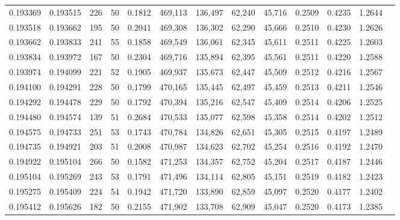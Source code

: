 \begin{tabular}{rrrrrrrrrrrrr}
0.193369 & 0.193515 &   226 &  50 &                                     0.1812 & 469,113 & 136,497 &  62,240 &  45,716 & 0.2509 & 0.4235 & 1.2644 \\
0.193518 & 0.193662 &   195 &  50 &                                     0.2041 & 469,308 & 136,302 &  62,290 &  45,666 & 0.2510 & 0.4230 & 1.2626 \\
0.193662 & 0.193833 &   241 &  55 &                                     0.1858 & 469,549 & 136,061 &  62,345 &  45,611 & 0.2511 & 0.4225 & 1.2603 \\
0.193834 & 0.193972 &   167 &  50 &                                     0.2304 & 469,716 & 135,894 &  62,395 &  45,561 & 0.2511 & 0.4220 & 1.2588 \\
0.193974 & 0.194099 &   221 &  52 &                                     0.1905 & 469,937 & 135,673 &  62,447 &  45,509 & 0.2512 & 0.4216 & 1.2567 \\
0.194100 & 0.194291 &   228 &  50 &                                     0.1799 & 470,165 & 135,445 &  62,497 &  45,459 & 0.2513 & 0.4211 & 1.2546 \\
0.194292 & 0.194478 &   229 &  50 &                                     0.1792 & 470,394 & 135,216 &  62,547 &  45,409 & 0.2514 & 0.4206 & 1.2525 \\
0.194480 & 0.194574 &   139 &  51 &                                     0.2684 & 470,533 & 135,077 &  62,598 &  45,358 & 0.2514 & 0.4202 & 1.2512 \\
0.194575 & 0.194733 &   251 &  53 &                                     0.1743 & 470,784 & 134,826 &  62,651 &  45,305 & 0.2515 & 0.4197 & 1.2489 \\
0.194735 & 0.194921 &   203 &  51 &                                     0.2008 & 470,987 & 134,623 &  62,702 &  45,254 & 0.2516 & 0.4192 & 1.2470 \\
0.194922 & 0.195104 &   266 &  50 &                                     0.1582 & 471,253 & 134,357 &  62,752 &  45,204 & 0.2517 & 0.4187 & 1.2446 \\
0.195104 & 0.195269 &   243 &  53 &                                     0.1791 & 471,496 & 134,114 &  62,805 &  45,151 & 0.2519 & 0.4182 & 1.2423 \\
0.195275 & 0.195409 &   224 &  54 &                                     0.1942 & 471,720 & 133,890 &  62,859 &  45,097 & 0.2520 & 0.4177 & 1.2402 \\
0.195412 & 0.195626 &   182 &  50 &                                     0.2155 & 471,902 & 133,708 &  62,909 &  45,047 & 0.2520 & 0.4173 & 1.2385 \\

\end{tabular}
